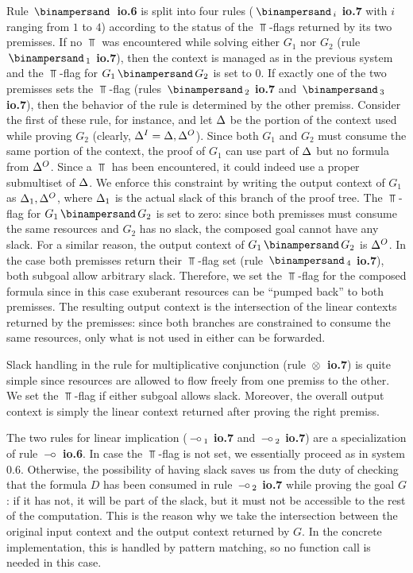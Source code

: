 Rule {\bf $\With$ io.6} is split into four rules ({\bf $\With_i$ io.7} with
$i$ ranging from $1$ to $4$) according to the status of the $\Top$-flags
returned by its two premisses. If no $\Top$ was encountered while solving
either $G_1$ nor $G_2$ (rule {\bf $\With_1$ io.7}), then the context is
managed as in the previous system and the $\Top$-flag for $G_1 \With G_2$ is
set to $0$. If exactly one of the two premisses sets the $\Top$-flag (rules
{\bf $\With_2$ io.7} and {\bf $\With_3$ io.7}), then the behavior of the rule
is determined by the other premiss. Consider the first of these rule, for
instance, and let $\Delta$ be the portion of the context used while proving $G_2$
(clearly, $\Delta^I = \Delta,\Delta^O$). Since both $G_1$ and $G_2$ must consume the same
portion of the context, the proof of $G_1$ can use part of $\Delta$ but no
formula from $\Delta^O$. Since a $\Top$ has been encountered, it could indeed use
a proper submultiset of $\Delta$. We enforce this constraint by writing the
output context of $G_1$ as $\Delta_1,\Delta^O$, where $\Delta_1$ is the actual slack of
this branch of the proof tree. The $\Top$-flag for $G_1 \With G_2$ is set to
zero: since both premisses must consume the same resources and $G_2$ has no
slack, the composed goal cannot have any slack. For a similar reason, the
output context of $G_1 \With G_2$ is $\Delta^O$. In the case both premisses
return their $\Top$-flag set (rule {\bf $\With_4$ io.7}), both subgoal allow
arbitrary slack. Therefore, we set the $\Top$-flag for the composed formula
since in this case exuberant resources can be ``pumped back'' to both
premisses. The resulting output context is the intersection of the linear
contexts returned by the premisses: since both branches are constrained to
consume the same resources, only what is not used in either can be forwarded.

Slack handling in the rule for multiplicative conjunction (rule {\bf $\, \otimes \,$
  io.7}) is quite simple since resources are allowed to flow freely from one
premiss to the other. We set the $\Top$-flag if either subgoal allows slack.
Moreover, the overall output context is simply the linear context returned
after proving the right premiss.

The two rules for linear implication ({\bf $\, \mbox{$-\!\circ$} \,_1$ io.7} and {\bf
  $\, \mbox{$-\!\circ$} \,_2$ io.7}) are a specialization of rule {\bf $\, \mbox{$-\!\circ$} \,$ io.6}. In case
the $\Top$-flag is not set, we essentially proceed as in system 0.6.
Otherwise, the possibility of having slack saves us from the duty of checking
that the formula $D$ has been consumed in rule {\bf $\, \mbox{$-\!\circ$} \,_2$ io.7} while
proving the goal $G$: if it has not, it will be part of the slack, but it
must not be accessible to the rest of the computation. This is the reason why
we take the intersection between the original input context and the output
context returned by $G$. In the concrete implementation, this is handled by
pattern matching, so no function call is needed in this case.

